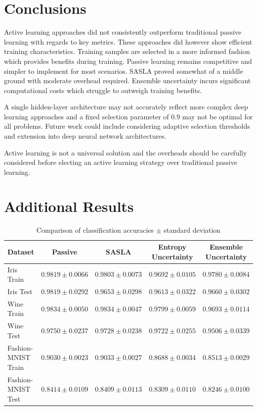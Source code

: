 \documentclass[10pt, conference]{IEEEtran}
\begin{document}
\section{Conclusions}
Active learning approaches did not consistently outperform traditional passive learning with regards to key metrics. These approaches did however show efficient training characteristics. Training samples are selected in a more informed fashion which provides benefits during training. Passive learning remains competitive and simpler to implement for most scenarios. SASLA proved somewhat of a middle ground with moderate overhead required. Ensemble uncertainty incurs significant computational costs which struggle to outweigh training benefits. 

A single hidden-layer architecture may not accurately reflect more complex deep learning approaches and a fixed selection parameter of 0.9 may not be optimal for all problems. Future work could include considering adaptive selection thresholds and extension into deep neural network architectures.

Active learning is not a universal solution and the overheads should be carefully considered before electing an active learning strategy over traditional passive learning.




\appendices
\section{Additional Results}

\begin{table}[ht]
	\caption{Comparison of classification accuracies $\pm$ standard deviation }
	\label{tab:comparison}
	\centering
	\begin{tabular}{|l|c|c|c|c|}
		\hline
		\textbf{Dataset} & \textbf{Passive} & \textbf{SASLA} & \textbf{Entropy Uncertainty} & \textbf{Ensemble Uncertainty} \\
		\hline
		Iris Train & $0.9819 \pm 0.0066$& $0.9803 \pm 0.0073$ & $0.9692\pm 0.0105$& $0.9780 \pm 0.0084$ \\
		Iris Test & $0.9819 \pm 0.0292$ & $0.9653 \pm 0.0298$  & $0.9613 \pm 0.0322$ & $0.9660 \pm 0.0302$  \\
		\hline
		Wine Train& $0.9834 \pm 0.0050$ & $0.9834 \pm 0.0047$ & $0.9799 \pm 0.0059$ & $0.9693 \pm 0.0114$ \\
		Wine Test & $0.9750 \pm 0.0237$ & $0.9728 \pm 0.0238$  & $0.9722 \pm 0.0255$ & $0.9506 \pm 0.0339$ \\
		\hline
		Fashion-MNIST Train & $0.9030 \pm 0.0023$ & $0.9033 \pm 0.0027$ & $0.8688 \pm 0.0034$ & $0.8513 \pm 0.0029$ \\
		Fashion-MNIST Test & $0.8414 \pm 0.0109$  & $0.8409 \pm 0.0113$  & $0.8309 \pm 0.0110$ & $0.8246 \pm 0.0100$  \\
		\hline
	\end{tabular}
\end{table}
\end{document}
